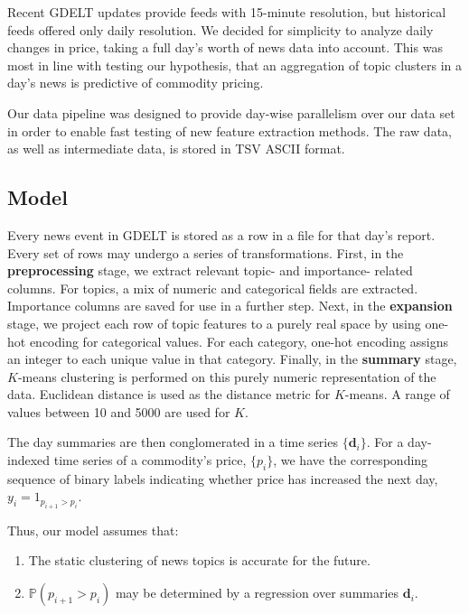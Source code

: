 Recent GDELT updates provide feeds with 15-minute resolution, but historical feeds offered only daily resolution. We decided for simplicity to analyze daily changes in price, taking a full day's worth of news data into account. This was most in line with testing our hypothesis, that an aggregation of topic clusters in a day's news is predictive of commodity pricing.

Our data pipeline was designed to provide day-wise parallelism over our data set in order to enable fast testing of new feature extraction methods. The raw data, as well as intermediate data, is stored in TSV ASCII format.

\subsection{Model}

Every news event in GDELT is stored as a row in a file for that day's report. Every set of rows may undergo a series of transformations. First, in the \textbf{preprocessing} stage, we extract relevant topic- and importance- related columns. For topics, a mix of numeric and categorical fields are extracted. Importance columns are saved for use in a further step. Next, in the \textbf{expansion} stage, we project each row of topic features to a purely real space by using one-hot encoding for categorical values. For each category, one-hot encoding assigns an integer to each unique value in that category. Finally, in the \textbf{summary} stage, $K$-means clustering is performed on this purely numeric representation of the data. Euclidean distance is used as the distance metric for $K$-means. A range of values between 10 and 5000 are used for $K$.

The day summaries are then conglomerated in a time series $\{\textbf{d}_i\}$. For a day-indexed time series of a commodity's price, $\{p_i\}$, we have the corresponding sequence of binary labels indicating whether price has increased the next day, $y_i=1_{p_{i+1}>p_i}$.

Thus, our model assumes that:
\begin{enumerate}
\item The static clustering of news topics is accurate for the future.
\item $\mathbb{P}(p_{i+1}>p_i)$ may be determined by a regression over summaries $\textbf{d}_i$. 
\end{enumerate}

